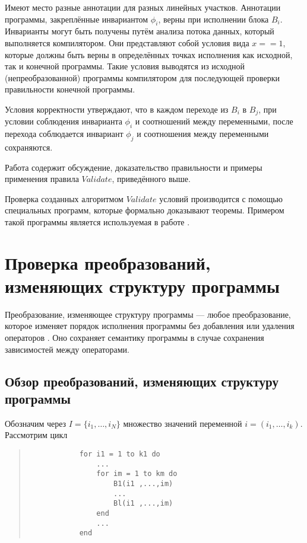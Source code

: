 \label{ss:invariants}
Имеют место разные аннотации для разных линейных участков. Аннотации программы, закреплённые инвариантом $\phi_{i}$, верны при исполнении блока $B_{i}$. Инварианты могут быть получены путём анализа потока данных, который выполняется компилятором. Они представляют собой условия вида $x == 1$, которые должны быть верны в определённых точках исполнения как исходной, так и конечной программы. Такие условия выводятся из исходной (непреобразованной) программы компилятором для последующей проверки правильности конечной программы.

Условия корректности утверждают, что в каждом переходе из $B_{i}$ в $B_{j}$, при условии соблюдения инварианта $\phi_{i}$ и соотношений между переменными, после перехода соблюдается инвариант $\phi_{j}$ и соотношения между переменными сохраняются.

Работа \cite{ZPFG02} содержит обсуждение, доказательство правильности и примеры применения правила $Validate$, приведённого выше.

Проверка созданных алгоритмом $Validate$ условий производится с помощью специальных программ, которые формально доказывают теоремы. Примером такой программы является используемая в работе \cite{PRSS99}.

\section{Проверка преобразований, изменяющих структуру программы}

Преобразование, изменяющее структуру программы --- любое преобразование, которое изменяет порядок исполнения программы без добавления или удаления операторов \cite{Bacon,AK02}. Оно сохраняет семантику программы в случае сохранения зависимостей между операторами.

\subsection{Обзор преобразований, изменяющих структуру программы}

Обозначим через $I = \{i_1, \ldots, i_N \}$ множество значений переменной $i = (i_1, \ldots, i_k)$. Рассмотрим цикл

\begin{center}
	\begin{quote}
		\begin{verbatim}
            for i1 = 1 to k1 do
                ...
                for im = 1 to km do
                    B1(i1 ,...,im)
                    ...
                    Bl(i1 ,...,im)
                end
                ...
            end
		\end{verbatim}
	\end{quote}
\end{center}


